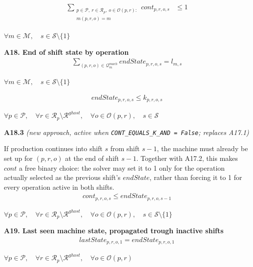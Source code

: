 \documentclass{article}
\begin{document}
\begin{align}
\sum_{\substack{
p \in \mathcal{P},\ r \in \mathcal{R}_p,\ o \in \mathcal{O}(p,r):\\
m(p,r,o)=m
}}
cont_{p,r,o,s}
&\le
1
\label{eq:A17_one_continuation_per_machine}
\end{align}
\begin{center}
$\forall m \in \mathcal{M}, \quad s \in \mathcal{S}\setminus\{1\}$
\end{center}

\noindent\textbf{A18. End of shift state by operation}
\begin{align}
\sum_{(p,r,o)\in \mathcal{Q}^{mach}_{m}}
endState_{p,r,o,s}
=
l_{m,s}
\label{eq:A18_setup_reference_unique}
\end{align}
\begin{center}
$\forall m \in \mathcal{M}, \quad s \in \mathcal{S}\setminus\{1\}$
\end{center}

\begin{align}
endState_{p,r,o,s}
\le
k_{p,r,o,s}
\label{eq:A18_setup_reference_prev_active}
\end{align}
\begin{center}
$\forall p \in \mathcal{P}, \quad
\forall r \in \mathcal{R}_p \setminus \mathcal{R}^{ghost}, \quad
\forall o \in \mathcal{O}(p,r), \quad
s \in \mathcal{S}$
\end{center}

\noindent\textbf{A18.3} \emph{(new approach, active when \texttt{CONT\_EQUALS\_K\_AND = False}; replaces A17.1)}

If production continues into shift $s$ from shift $s-1$, the machine must already be set up for $(p,r,o)$ at the end of shift $s-1$. Together with A17.2, this makes $cont$ a free binary choice: the solver may set it to 1 only for the operation actually selected as the previous shift's $endState$, rather than forcing it to 1 for every operation active in both shifts.
\begin{align}
cont_{p,r,o,s}
\le
endState_{p,r,o,s-1}
\label{eq:A18_continuation_implies_prev_endstate}
\end{align}
\begin{center}
$\forall p \in \mathcal{P}, \quad
\forall r \in \mathcal{R}_p \setminus \mathcal{R}^{ghost}, \quad
\forall o \in \mathcal{O}(p,r), \quad
s \in \mathcal{S}\setminus\{1\}$
\end{center}

\noindent\textbf{A19. Last seen machine state, propagated trough inactive shifts}
\begin{align}
lastState_{p,r,o,1}
=
endState_{p,r,o,1}
\label{eq:A19_define_last_state}
\end{align}
\begin{center}
$\forall p \in \mathcal{P}, \quad
\forall r \in \mathcal{R}_p \setminus \mathcal{R}^{ghost}, \quad
\forall o \in \mathcal{O}(p,r)$
\end{center}
\end{document}
